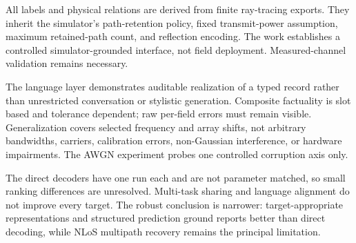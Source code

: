 All labels and physical relations are derived from finite ray-tracing exports. They inherit the
simulator's path-retention policy, fixed transmit-power assumption, maximum retained-path count, and
reflection encoding. The work establishes a controlled simulator-grounded interface, not field
deployment. Measured-channel validation remains necessary.

The language layer demonstrates auditable realization of a typed record rather than unrestricted
conversation or stylistic generation. Composite factuality is slot based and tolerance dependent; raw
per-field errors must remain visible. Generalization covers selected frequency and array shifts, not
arbitrary bandwidths, carriers, calibration errors, non-Gaussian interference, or hardware
impairments. The AWGN experiment probes one controlled corruption axis only.

The direct decoders have one run each and are not parameter matched, so small ranking differences
are unresolved. Multi-task sharing and language alignment do not improve every target. The robust
conclusion is narrower: target-appropriate representations and structured prediction ground reports
better than direct decoding, while NLoS multipath recovery remains the principal limitation.
